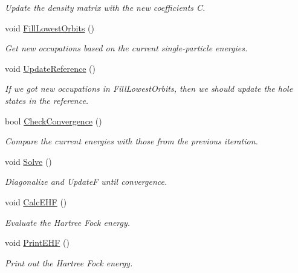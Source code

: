 \begin{DoxyCompactItemize}
\begin{DoxyCompactList}\small\item\em Update the density matrix with the new coefficients C. \end{DoxyCompactList}\item 
void \hyperlink{classHartreeFock_a74c842cbf4e8caec72591c1205794f1f}{Fill\+Lowest\+Orbits} ()
\begin{DoxyCompactList}\small\item\em Get new occupations based on the current single-\/particle energies. \end{DoxyCompactList}\item 
\mbox{\label{classHartreeFock_af7dbc7d8aa192f192f23347c46ad084c}} 
void \hyperlink{classHartreeFock_af7dbc7d8aa192f192f23347c46ad084c}{Update\+Reference} ()
\begin{DoxyCompactList}\small\item\em If we got new occupations in Fill\+Lowest\+Orbits, then we should update the hole states in the reference. \end{DoxyCompactList}\item 
bool \hyperlink{classHartreeFock_a35ab9c4f96e68b1c9acea1d1407ecc60}{Check\+Convergence} ()
\begin{DoxyCompactList}\small\item\em Compare the current energies with those from the previous iteration. \end{DoxyCompactList}\item 
void \hyperlink{classHartreeFock_a0666507747c17845ab4f74b97414703c}{Solve} ()
\begin{DoxyCompactList}\small\item\em Diagonalize and UpdateF until convergence. \end{DoxyCompactList}\item 
void \hyperlink{classHartreeFock_aef506c5c5bc0f317ceb9c71bdc44d62b}{Calc\+E\+HF} ()
\begin{DoxyCompactList}\small\item\em Evaluate the Hartree Fock energy. \end{DoxyCompactList}\item 
void \hyperlink{classHartreeFock_a2c3bdda2ea86f9a3b18d203c9aecc353}{Print\+E\+HF} ()
\begin{DoxyCompactList}\small\item\em Print out the Hartree Fock energy. \end{DoxyCompactList}\item 

\end{DoxyCompactItemize}
